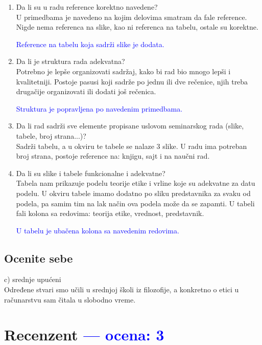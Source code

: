\documentclass[a4paper]{report}
\newcommand{\odgovor}[1]{\textcolor{blue}{#1}}
\begin{document}
\begin{enumerate}
\item Da li su u radu reference korektno navedene?\\
U primedbama je navedeno na kojim delovima smatram da fale reference. Nigde nema referenca na slike, kao ni referenca na tabelu, ostale su korektne.

\odgovor{Reference na tabelu koja sadrži slike je dodata.}

\item Da li je struktura rada adekvatna?\\
Potrebno je lepše organizovati sadržaj, kako bi rad bio mnogo lepši i kvalitetniji. Postoje pasusi koji sadrže po jednu ili dve rečenice, njih treba drugačije organizovati ili dodati još rečenica.

\odgovor{Struktura je popravljena po navedenim primedbama.}

\item Da li rad sadrži sve elemente propisane uslovom seminarskog rada (slike, tabele, broj strana...)?\\ Sadrži tabelu, a u okviru te tabele se nalaze 3 slike. U radu ima potreban broj strana, postoje reference na: knjigu, sajt i na naučni rad.

\item Da li su slike i tabele funkcionalne i adekvatne?\\ Tabela nam prikazuje podelu teorije etike i vrline koje su adekvatne za datu podelu. U okviru tabele imamo dodatno po sliku predstavnika za svaku od podela, pa samim tim na lak način ova podela može da se zapamti. U tabeli fali kolona sa redovima: teorija etike, vrednost, predstavnik.

\odgovor{U tabelu je ubačena kolona sa navedenim redovima.}

\end{enumerate}

\section{Ocenite sebe}
c) srednje upućeni
  \\ Određene stvari smo učili u srednjoj školi iz filozofije, a konkretno o etici u računarstvu sam čitala u slobodno vreme.

\chapter{Recenzent \odgovor{--- ocena: 3} }
\end{document}
